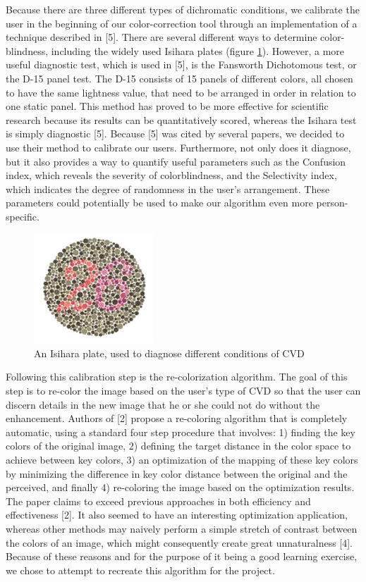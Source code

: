 \documentclass[10pt,twocolumn,letterpaper]{article}
\begin{document}
	Because there are three different types of dichromatic conditions, we calibrate the user in the beginning of our color-correction tool through an implementation of a technique described in [5]. There are several different ways to determine color-blindness, including the widely used Isihara plates (figure \ref{fig:plate}). However, a more useful diagnostic test, which is used in [5], is the Fansworth Dichotomous test, or the D-15 panel test. The D-15 consists of 15 panels of different colors, all chosen to have the same lightness value, that need to be arranged in order in relation to one static panel. This method has proved to be more effective for scientific research because its results can be quantitatively scored, whereas the Isihara test is simply diagnostic [5]. Because [5] was cited by several papers, we decided to use their method to calibrate our users. Furthermore, not only does it diagnose, but it also provides a way to quantify useful parameters such as the Confusion index, which reveals the severity of colorblindness, and the Selectivity index, which indicates the degree of randomness in the user’s arrangement. These parameters could potentially be used to make our algorithm even more person-specific. 

\begin{figure}[h]
  \includegraphics[width=0.4\textwidth]{plate.png}
  \caption{An Isihara plate, used to diagnose different conditions of CVD}
  \label{fig:plate}
\end{figure}

	Following this calibration step is the re-colorization algorithm. The goal of this step is to re-color the image based on the user’s type of CVD so that the user can discern details in the new image that he or she could not do without the enhancement. Authors of [2] propose a re-coloring algorithm that is completely automatic, using a standard four step procedure that involves: 1) finding the key colors of the original image, 2) defining the target distance in the color space to achieve between key colors, 3) an optimization of the mapping of these key colors by minimizing the difference in key color distance between the original and the perceived, and finally 4) re-coloring the image based on the optimization results. The paper claims to exceed previous approaches in both efficiency and effectiveness [2]. It also seemed to have an interesting optimization application, whereas other methods may naively perform a simple stretch of contrast between the colors of an image, which might consequently create great unnaturalness [4]. Because of these reasons and for the purpose of it being a good learning exercise, we chose to attempt to recreate this algorithm for the project. 
\end{document}

